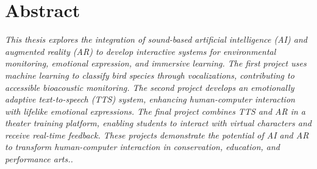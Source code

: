 \vspace*{\fill}

\section*{Abstract}
\textit{This thesis explores the integration of sound-based artificial intelligence (AI) and augmented reality (AR) to develop interactive systems for environmental monitoring, emotional expression, and immersive learning. The first project uses machine learning to classify bird species through vocalizations, contributing to accessible bioacoustic monitoring. The second project develops an emotionally adaptive text-to-speech (TTS) system, enhancing human-computer interaction with lifelike emotional expressions. The final project combines TTS and AR in a theater training platform, enabling students to interact with virtual characters and receive real-time feedback. These projects demonstrate the potential of AI and AR to transform human-computer interaction in conservation, education, and performance arts..}
\vspace*{\fill}
